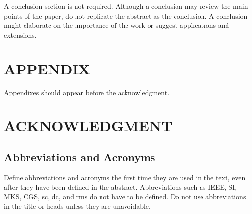 \documentclass[a4paper, 10pt, conference]{ieeeconf}      %
\begin{document}
A conclusion section is not required. Although a conclusion may review the main points of the paper, do not replicate the abstract as the conclusion. A conclusion might elaborate on the importance of the work or suggest applications and extensions. 

\addtolength{\textheight}{-12cm}   %







\section*{APPENDIX}

Appendixes should appear before the acknowledgment.

\section*{ACKNOWLEDGMENT}

\subsection{Abbreviations and Acronyms} Define abbreviations and acronyms the first time they are used in the text, even after they have been defined in the abstract. Abbreviations such as IEEE, SI, MKS, CGS, sc, dc, and rms do not have to be defined. Do not use abbreviations in the title or heads unless they are unavoidable.
\end{document}
